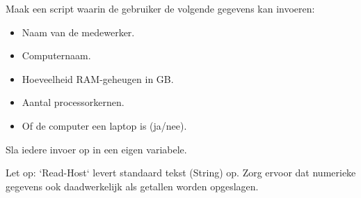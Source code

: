 
Maak een script waarin de gebruiker de volgende gegevens kan invoeren:

\begin{itemize}
\item Naam van de medewerker.
\item Computernaam.
\item Hoeveelheid RAM-geheugen in GB.
\item Aantal processorkernen.
\item Of de computer een laptop is (ja/nee).
\end{itemize}

Sla iedere invoer op in een eigen variabele.

Let op: `Read-Host` levert standaard tekst (String) op. Zorg ervoor dat numerieke gegevens ook daadwerkelijk als getallen worden opgeslagen.


